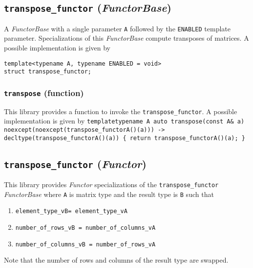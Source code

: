 \subsection{\texttt{transpose\_functor} (\textit{FunctorBase})}
A \textit{FunctorBase} with a single parameter \texttt{A} followed by the \texttt{ENABLED} template parameter.
Specializations of this \textit{FunctorBase} compute transposes of matrices.
A possible implementation is given by
\begin{verbatim}
template<typename A, typename ENABLED = void>
struct transpose_functor;
\end{verbatim}

\subsubsection{\texttt{transpose} (function)}
This library provides a function to invoke the \texttt{transpose\_functor}.
A possible implementation is given by\newline
\texttt{template\textlangle typename A\textrangle\newline
auto\newline
transpose(const A\& a)\newline
noexcept(noexcept(transpose\_functor\textlangle A\textrangle()(a)))\newline
-> decltype(transpose\_functor\textlangle A\textrangle()(a))\newline
\{ return transpose\_functor\textlangle A\textrangle()(a); \}}

\subsection{\texttt{transpose\_functor} (\textit{Functor})}
This library provides \textit{Functor} specializations of the \texttt{transpose\_functor} \textit{FunctorBase}
where \texttt{A} is matrix type and the result type is \texttt{B} such that
\begin{enumerate}
	\item \texttt{element\_type\_v\textlangle B\textrangle = element\_type\_v\textlangle A\textrangle}
	\item \texttt{number\_of\_rows\_v\textlangle B \textrangle = number\_of\_columns\_v\textlangle A\textrangle}
	\item \texttt{number\_of\_columns\_v\textlangle B \textrangle = number\_of\_rows\_v\textlangle A\textrangle}
\end{enumerate}
\noindent{}Note that the number of rows and columns of the result type are swapped.
